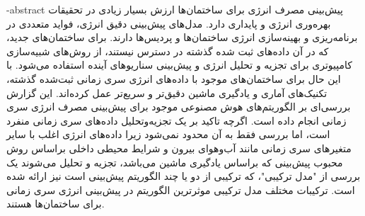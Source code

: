 \department{}

\fa-abstract{
    پیش‌بینی مصرف انرژی برای ساختمان‌ها ارزش بسیار زیادی در تحقیقات بهره‌وری انرژی و پایداری دارد. مدل‌های پیش‌بینی دقیق انرژی، فواید متعددی در برنامه‌ریزی
     و بهینه‌سازی انرژی ساختمان‌ها و پردیس‌ها دارند. برای ساختمان‌های جدید، 
    که در آن داده‌های ثبت شده گذشته در دسترس نیستند، از روش‌های شبیه‌سازی کامپیوتری برای تجزیه و تحلیل انرژی و پیش‌بینی سناریوهای آینده استفاده می‌شود.
    با این‌ حال برای ساختمان‌های موجود با داده‌های انرژی سری زمانی ثبت‌شده گذشته، تکنیک‌های آماری و یادگیری ماشین دقیق‌تر و سریع‌تر عمل کرده‌اند. 
    این گزارش بررسی‌ای بر الگوریتم‌های هوش مصنوعی موجود برای پیش‌بینی مصرف انرژی سری زمانی انجام داده است.
     اگرچه تاکید بر یک تجزیه‌و‌تحلیل داده‌های سری زمانی منفرد است، اما بررسی فقط به آن محدود نمی‌شود زیرا داده‌های انرژی 
     اغلب با سایر متغیرهای سری زمانی مانند آب‌و‌هوای بیرون و شرایط محیطی داخلی براساس روش محبوب پیش‌بینی که براساس یادگیری ماشین می‌باشد، تجزیه و تحلیل می‌شوند 
      یک بررسی از "مدل ترکیبی"، که ترکیبی از دو یا چند الگوریتم پیش‌بینی است نیز ارائه شده است.
      ترکیبات مختلف مدل ترکیبی موثرترین الگوریتم در پیش‌بینی انرژی سری زمانی برای ساختمان‌ها هستند.
}




\vspace*{7cm}
\thispagestyle{empty}
\begin{center}

\end{center}